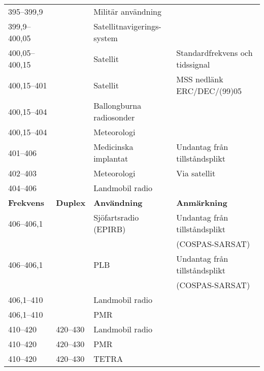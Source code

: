 \documentclass[10pt,swedish,a4paper,twoside]{article}
\begin{document}
\begin{landscape}
\begin{longtable}{llll}
	395--399,9         &                    & Militär användning             &  \\
	399,9--400,05      &                    & Satellitnavigerings-system     &  \\
	400,05--400,15     &                    & Satellit                       & Standardfrekvens och tidssignal     \\
	400,15--401        &                    & Satellit                       & MSS nedlänk ERC/DEC/(99)05          \\
	400,15--404        &                    & Ballongburna radiosonder       &  \\
	400,15--404        &                    & Meteorologi                    &  \\
	401--406           &                    & Medicinska implantat           & Undantag från tillståndsplikt       \\
	402--403           &                    & Meteorologi                    & Via satellit                        \\
	404--406           &                    & Landmobil radio                &  \\
	\textbf{Frekvens}  & \textbf{Duplex}    & \textbf{Användning}            & \textbf{Anmärkning}                 \\ \hline
	406--406,1         &                    & Sjöfartsradio (EPIRB)          & Undantag från tillståndsplikt       \\
	                   &                    &                                & (COSPAS-SARSAT)                     \\
	406--406,1         &                    & PLB                            & Undantag från tillståndsplikt       \\
	                   &                    &                                & (COSPAS-SARSAT)                     \\
	406,1--410         &                    & Landmobil radio                &  \\
	406,1--410         &                    & PMR                            &  \\
	410--420           & 420--430           & Landmobil radio                &  \\
	410--420           & 420--430           & PMR                            &  \\
	410--420           & 420--430           & TETRA                          &  \\

\end{longtable}
\end{landscape}
\end{document}
